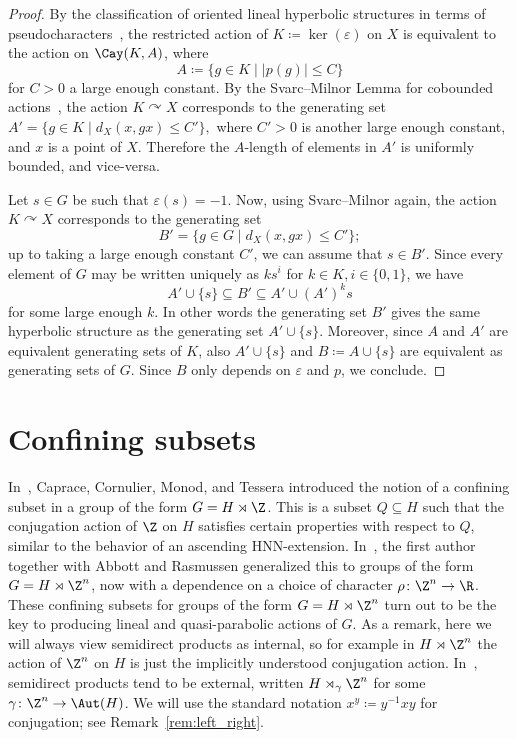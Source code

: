 \begin{proof}
By the classification of oriented lineal hyperbolic structures in terms of pseudocharacters~\cite[Section 2.3]{ABO}, the restricted action of $K \coloneqq \ker(\varepsilon)$ on $X$ is equivalent to the action on $\Cay(K, A)$, where
\[A \coloneqq \{ g \in K \mid |p(g)| \leq C \}\]
for $C > 0$ a large enough constant. By the Svarc--Milnor Lemma for cobounded actions~\cite[Lemma 3.11]{ABO}, the action $K \curvearrowright X$ corresponds to the generating set
\(A' = \{ g \in K \mid d_X(x, gx) \leq C' \},\)
where $C' > 0$ is another large enough constant, and $x$ is a point of $X$. Therefore the $A$-length of elements in $A'$ is uniformly bounded, and vice-versa.

Let $s \in G$ be such that $\varepsilon(s) = -1$. Now, using Svarc--Milnor again, the action $K \curvearrowright X$ corresponds to the generating set
\[B' = \{ g \in G \mid d_X(x, gx) \leq C' \};\]
up to taking a large enough constant $C'$, we can assume that $s \in B'$. Since every element of $G$ may be written uniquely as $ks^i$ for $k \in K, i \in \{0, 1\}$, we have
\[A' \cup \{ s \} \subseteq B' \subseteq A' \cup (A')^k s \]
for some large enough $k$. In other words the generating set $B'$ gives the same hyperbolic structure as the generating set $A' \cup \{ s \}$. Moreover, since $A$ and $A'$ are equivalent generating sets of $K$, also $A' \cup \{ s \}$ and $B \coloneqq A \cup \{ s \}$ are equivalent as generating sets of $G$. Since $B$ only depends on $\varepsilon$ and $p$, we conclude.
\end{proof}

\section{Confining subsets}\label{sec:confining}

In~\cite{caprace15}, Caprace, Cornulier, Monod, and Tessera introduced the notion of a confining subset in a group of the form $G=H\rtimes \Z$. This is a subset $Q\subseteq H$ such that the conjugation action of $\Z$ on $H$ satisfies certain properties with respect to $Q$, similar to the behavior of an ascending HNN-extension. In~\cite{confining}, the first author together with Abbott and Rasmussen generalized this to groups of the form $G=H\rtimes\Z^n$, now with a dependence on a choice of character $\rho\colon \Z^n\to\R$. These confining subsets for groups of the form $G=H\rtimes\Z^n$ turn out to be the key to producing lineal and quasi-parabolic actions of $G$. As a remark, here we will always view semidirect products as internal, so for example in $H\rtimes\Z^n$ the action of $\Z^n$ on $H$ is just the implicitly understood conjugation action. In~\cite{caprace15,confining}, semidirect products tend to be external, written $H\rtimes_\gamma\Z^n$ for some $\gamma\colon \Z^n\to\Aut(H)$. We will use the standard notation $x^y\coloneqq y^{-1}xy$ for conjugation; see Remark~\ref{rem:left_right}.

